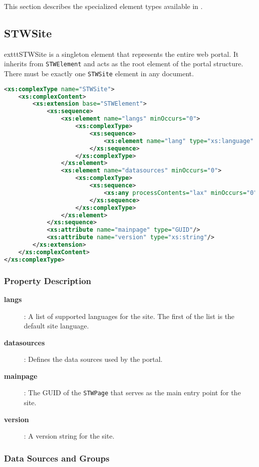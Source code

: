 This section describes the specialized element types available in \wbdl{}.

\subsection{STWSite}

	exttt{STWSite} is a singleton element that represents the entire web portal. It inherits from \texttt{STWElement} and acts as the root element of the portal structure. There must be exactly one \texttt{STWSite} element in any \wbdl{} document.

\begin{lstlisting}[language=XML,caption={STWSite Type Definition}]
<xs:complexType name="STWSite">
	<xs:complexContent>
		<xs:extension base="STWElement">
			<xs:sequence>
				<xs:element name="langs" minOccurs="0">
					<xs:complexType>
						<xs:sequence>
							<xs:element name="lang" type="xs:language" maxOccurs="unbounded"/>
						</xs:sequence>
					</xs:complexType>
				</xs:element>
				<xs:element name="datasources" minOccurs="0">
					<xs:complexType>
						<xs:sequence>
							<xs:any processContents="lax" minOccurs="0" maxOccurs="unbounded"/>
						</xs:sequence>
					</xs:complexType>
				</xs:element>
			</xs:sequence>
			<xs:attribute name="mainpage" type="GUID"/>
			<xs:attribute name="version" type="xs:string"/>
		</xs:extension>
	</xs:complexContent>
</xs:complexType>
\end{lstlisting}

\subsubsection{Property Description}

\begin{description}
\item[\textbf{langs}]: A list of supported languages for the site. The first of the list is the default site language.
\item[\textbf{datasources}]: Defines the data sources used by the portal.
\item[\textbf{mainpage}]: The GUID of the \texttt{STWPage} that serves as the main entry point for the site.
\item[\textbf{version}]: A version string for the site.
\end{description}

\subsubsection{Data Sources and Groups}
\label{sec:datasources-groups}


